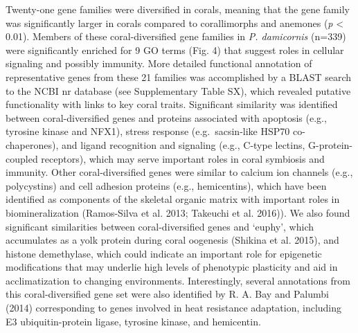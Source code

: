\documentclass[]{elsarticle} %
\begin{document}
Twenty-one gene families were diversified in corals, meaning that the
gene family was significantly larger in corals compared to corallimorphs
and anemones (\emph{p} \textless{} 0.01). Members of these
coral-diversified gene families in \emph{P. damicornis} (n=339) were
significantly enriched for 9 GO terms (Fig. 4) that suggest roles in
cellular signaling and possibly immunity. More detailed functional
annotation of representative genes from these 21 families was
accomplished by a BLAST search to the NCBI nr database (see
Supplementary Table SX), which revealed putative functionality with
links to key coral traits. Significant similarity was identified between
coral-diversified genes and proteins associated with apoptosis (e.g.,
tyrosine kinase and NFX1), stress response (e.g.~sacsin-like HSP70
co-chaperones), and ligand recognition and signaling (e.g., C-type
lectins, G-protein-coupled receptors), which may serve important roles
in coral symbiosis and immunity. Other coral-diversified genes were
similar to calcium ion channels (e.g., polycystins) and cell adhesion
proteins (e.g., hemicentins), which have been identified as components
of the skeletal organic matrix with important roles in biomineralization
(Ramos-Silva et al. 2013; Takeuchi et al. 2016)). We also found
significant similarities between coral-diversified genes and `euphy',
which accumulates as a yolk protein during coral oogenesis (Shikina et
al. 2015), and histone demethylase, which could indicate an important
role for epigenetic modifications that may underlie high levels of
phenotypic plasticity and aid in acclimatization to changing
environments. Interestingly, several annotations from this
coral-diversified gene set were also identified by R. A. Bay and Palumbi
(2014) corresponding to genes involved in heat resistance adaptation,
including E3 ubiquitin-protein ligase, tyrosine kinase, and hemicentin.
\end{document}

